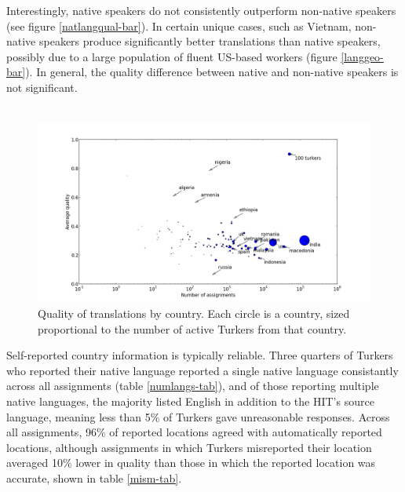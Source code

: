 \documentclass[11pt]{article}
\begin{document}
Interestingly, native speakers do not consistently outperform non-native speakers (see figure \ref{natlangqual-bar}). In certain unique cases, such as Vietnam, non-native speakers produce significantly better translations than native speakers, possibly due to a large population of fluent US-based workers (figure \ref{langgeo-bar}). In general, the quality difference between native and non-native speakers is not significant.	\\\\

\begin{figure}[h]
\centering
\includegraphics[width=6in]{figures/quality-scatter-avgturkers-country-labeled}
\caption{Quality of translations by country. Each circle is a country, sized proportional to the number of active Turkers from that country.}
\label{quality-scatter}
\end{figure}

Self-reported country information is typically reliable. Three quarters of Turkers who reported their native language reported a single native language consistantly across all assignments (table \ref{numlangs-tab}), and of those reporting multiple native languages, the majority listed English in addition to the HIT's source language, meaning less than 5\% of Turkers gave unreasonable responses. Across all assignments, 96\% of reported locations agreed with automatically reported locations, although assignments in which Turkers misreported their location averaged 10\% lower in quality than those in which the reported location was accurate, shown in table \ref{mism-tab}.\\\\
\end{document}
